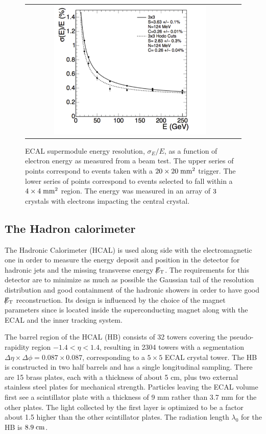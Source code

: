 \begin{figure}[tbh!]
	\centering
	\begin{tabular}{cc}
		\includegraphics[width=0.75\textwidth]{detector/pics/ECAL_resolution.pdf}
	\end{tabular}
	\caption{ECAL supermodule energy resolution, $\sigma_{E}/E$, as a function of electron energy as measured from a beam test. The upper series of points correspond to events taken with a $20\times20\;\text{mm}^{2}$ trigger. The lower series of points correspond to events selected to fall within a $4\times4\;\text{mm}^{2}$ region. The energy was measured in an array of $3\time3$ crystals with electrons impacting the central crystal.}
	\label{fig:ECAL_resolution}
\end{figure}

\clearpage

\subsection{The Hadron calorimeter}

The Hadronic Calorimeter (HCAL) is used along side with the electromagnetic one in order to measure the energy deposit and position in the detector for hadronic jets and the missing transverse energy $\slash\mkern-12mu{E}_{\text{T}}$. The requirements for this detector are to minimize as much as possible the Gaussian tail of the resolution distribution and good containment of the hadronic showers in order to have good $\slash\mkern-12mu{E}_{\text{T}}$ reconstruction. Its design is influenced by the choice of the magnet parameters since is located inside the superconducting magnet along with the ECAL and the inner tracking system. 

The barrel region of the HCAL (HB) consists of 32 towers covering the pseudo-rapidity region $-1.4 < \eta < 1.4$, resulting in 2304 towers with a segmentation $\Delta\eta\times\Delta\phi = 0.087\times0.087$, corresponding to a $5\times5$ ECAL crystal tower. The HB is constructed in two half barrels and has a single longitudinal sampling. There are 15 brass plates, each with a thickness of about 5 cm, plus two external stainless steel plates for mechanical strength. Particles leaving the ECAL volume first see a scintillator plate with a thickness of 9 mm rather than 3.7 mm for the other plates. The light collected by the first layer is optimized to be a factor about 1.5 higher than the other scintillator plates. The radiation length $\lambda_{0}$ for the HB is $8.9\;\text{cm}$.

